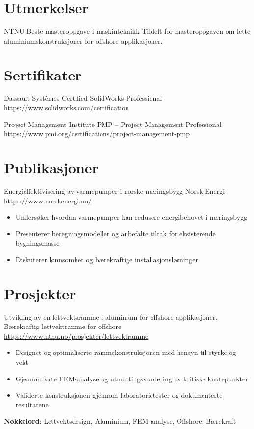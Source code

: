 \documentclass[a4paper, serif, 10pt]{moderncv}
\begin{document}
\section{Utmerkelser}

        {NTNU}
        {Beste masteroppgave i maskinteknikk}
        {}
        {}
        {Tildelt for masteroppgaven om lette aluminiumskonstruksjoner for offshore-applikasjoner.}
\section{Sertifikater}

        {Dassault Systèmes}
        {Certified SolidWorks Professional}
        {\url{https://www.solidworks.com/certification}}
        {}
        {}

        {Project Management Institute}
        {PMP – Project Management Professional}
        {\url{https://www.pmi.org/certifications/project-management-pmp}}
        {}
        {}
\section{Publikasjoner}

        {Energieffektivisering av varmepumper i norske næringsbygg}
        {Norsk Energi}
        {\url{https://www.norskenergi.no/}}
        {}
        {\begin{itemize}
\item Undersøker hvordan varmepumper kan redusere energibehovet i næringsbygg
\item Presenterer beregningsmodeller og anbefalte tiltak for eksisterende bygningsmasse
\item Diskuterer lønnsomhet og bærekraftige installasjonsløsninger
\end{itemize}}
\section{Prosjekter}

        {Utvikling av en lettvektsramme i aluminium for offshore-applikasjoner.}
        {Bærekraftig lettvektramme for offshore}
        {\url{https://www.ntnu.no/prosjekter/lettvektramme}}
        {}
        {\begin{itemize}
\item Designet og optimaliserte rammekonstruksjonen med hensyn til styrke og vekt
\item Gjennomførte FEM-analyse og utmattingsvurdering av kritiske knutepunkter
\item Validerte konstruksjonen gjennom laboratorietester og dokumenterte resultatene
\end{itemize}
\textbf{Nøkkelord}: Lettvektsdesign, Aluminium, FEM-analyse, Offshore, Bærekraft}
\end{document}
